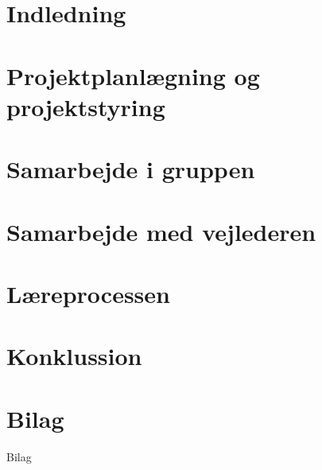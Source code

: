 \documentclass[12pt,a4paper]{report}
\begin{document}
\setcounter{page}{2}

\begin{titlepage}

\thispagestyle{empty}
\end{titlepage}


\tableofcontents
\thispagestyle{empty}

\renewcommand{\chaptername}{Kapitel}

\chapter{Indledning}
\setcounter{page}{3}
	

\chapter{Projektplanlægning og projektstyring}
 
    


\chapter{Samarbejde i gruppen}
 
    


\chapter{Samarbejde med vejlederen}
 
    


\chapter{Læreprocessen}
 
    


\chapter{Konklussion}
 
    

\chapter*{Bilag}
 {Bilag}
\end{document}
